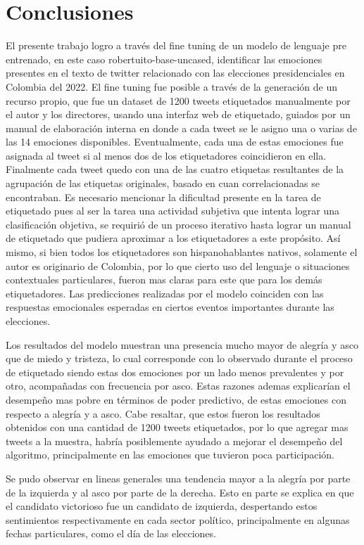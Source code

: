 \chapter{Conclusiones}
 

El presente trabajo logro a través del fine tuning de un modelo de lenguaje pre entrenado, en este caso robertuito-base-uncased, identificar las emociones presentes en el texto de twitter relacionado con las elecciones presidenciales en Colombia del 2022. El fine tuning fue posible a través de la generación de un recurso propio, que fue un dataset de 1200 tweets etiquetados manualmente por el autor y los directores, usando una interfaz web de etiquetado, guiados por un manual de elaboración interna en donde a cada tweet se le asigno una o varias de las 14 emociones disponibles. Eventualmente, cada una de estas emociones fue asignada al tweet si al menos dos de los etiquetadores coincidieron en ella. Finalmente cada tweet quedo con una de las cuatro etiquetas resultantes de la agrupación de las etiquetas originales, basado en cuan correlacionadas se encontraban. Es necesario mencionar la dificultad presente en la tarea de etiquetado pues al ser la tarea una actividad subjetiva que intenta lograr una clasificación objetiva, se requirió de un proceso iterativo hasta lograr un manual de etiquetado que pudiera aproximar a los etiquetadores a este propósito. Así mismo, si bien todos los etiquetadores son hispanohablantes nativos, solamente el autor es originario de Colombia, por lo que cierto uso del lenguaje o situaciones contextuales particulares, fueron mas claras para este que para los demás etiquetadores. Las predicciones realizadas por el modelo coinciden con las respuestas emocionales esperadas en ciertos eventos importantes durante las elecciones. 

Los resultados del modelo muestran una presencia mucho mayor de alegría y asco que de miedo y tristeza, lo cual corresponde con lo observado durante el proceso de etiquetado siendo estas dos emociones por un lado menos prevalentes y por otro, acompañadas con frecuencia por asco. Estas razones ademas explicarían el desempeño mas pobre en términos de poder predictivo, de estas emociones con respecto a alegría y a asco. Cabe resaltar, que estos fueron los resultados obtenidos con una cantidad de 1200 tweets etiquetados, por lo que agregar mas tweets a la muestra, habría posiblemente ayudado a mejorar el desempeño del algoritmo, principalmente en las emociones que tuvieron poca participación. 

Se pudo observar en lineas generales una tendencia mayor a la alegría por parte de la izquierda y al asco por parte de la derecha. Esto en parte se explica en que el candidato victorioso fue un candidato de izquierda, despertando estos sentimientos respectivamente en cada sector político, principalmente en algunas fechas particulares, como el día de las elecciones.

